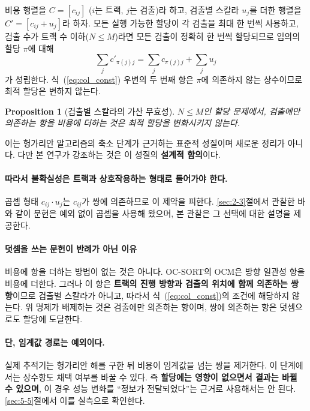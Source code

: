 \documentclass[12pt,a4paper,oneside]{report}
\newtheorem{proposition}[theorem]{Proposition}
\begin{document}
비용 행렬을 $C = [c_{ij}]$ ($i$는 트랙, $j$는 검출)라 하고, 검출별 스칼라 $u_j$를 더한 행렬을 $C' = [c_{ij} + u_j]$라 하자. 모든 실행 가능한 할당이 각 검출을 최대 한 번씩 사용하고, 검출 수가 트랙 수 이하($N \le M$)라면 모든 검출이 정확히 한 번씩 할당되므로 임의의 할당 $\pi$에 대해
\begin{equation}
\sum_{j} c'_{\pi(j)j} = \sum_{j} c_{\pi(j)j} + \sum_{j} u_j
\label{eq:col_const}
\end{equation}
가 성립한다. 식~(\ref{eq:col_const}) 우변의 두 번째 항은 $\pi$에 의존하지 않는 상수이므로 최적 할당은 변하지 않는다.

\begin{proposition}[검출별 스칼라의 가산 무효성]
$N \le M$인 할당 문제에서, 검출에만 의존하는 항을 비용에 더하는 것은 최적 할당을 변화시키지 않는다.
\end{proposition}

이는 헝가리안 알고리즘의 축소 단계가 근거하는 표준적 성질이며 새로운 정리가 아니다. 다만 본 연구가 강조하는 것은 이 성질의 \textbf{설계적 함의}이다.

\paragraph{따라서 불확실성은 트랙과 상호작용하는 형태로 들어가야 한다.} 곱셈 형태 $c_{ij} \cdot u_j$는 $c_{ij}$가 쌍에 의존하므로 이 제약을 피한다. \ref{sec:2-3}절에서 관찰한 바와 같이 문헌은 예외 없이 곱셈을 사용해 왔으며, 본 관찰은 그 선택에 대한 설명을 제공한다.

\paragraph{덧셈을 쓰는 문헌이 반례가 아닌 이유} 비용에 항을 더하는 방법이 없는 것은 아니다. OC-SORT\citep{cao2023}의 OCM은 방향 일관성 항을 비용에 더한다. 그러나 이 항은 \textbf{트랙의 진행 방향과 검출의 위치에 함께 의존하는 쌍 항}이므로 검출별 스칼라가 아니고, 따라서 식~(\ref{eq:col_const})의 조건에 해당하지 않는다. 위 명제가 배제하는 것은 검출에만 의존하는 항이며, 쌍에 의존하는 항은 덧셈으로도 할당에 도달한다.

\paragraph{단, 임계값 경로는 예외이다.} 실제 추적기는 헝가리안 해를 구한 뒤 비용이 임계값을 넘는 쌍을 제거한다. 이 단계에서는 상수항도 채택 여부를 바꿀 수 있다. 즉 \textbf{할당에는 영향이 없으면서 결과는 바뀔 수 있으며}, 이 경우 성능 변화를 ``정보가 전달되었다''는 근거로 사용해서는 안 된다. \ref{sec:5-5}절에서 이를 실측으로 확인한다.
\end{document}
